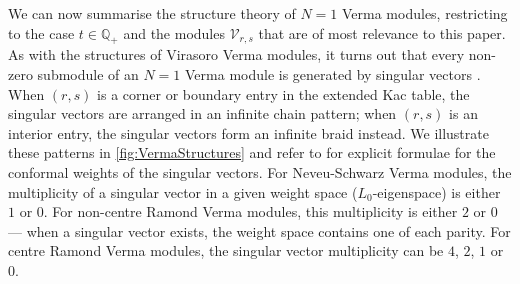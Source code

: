 \documentclass[a4paper,reqno,12pt]{report}
\theoremstyle{definition}
\numberwithin{equation}{section}
\newcommand{\QQ}{\mathbb{Q}}
\newcommand{\Ver}[1]{\mathcal{V}_{#1}}       %
\newcommand{\sv}{singular vector}
\newcommand{\svs}{singular vectors}
\newcommand{\ns}{Neveu-Schwarz}
\theoremstyle{plain}
\begin{document}
We can now summarise the structure theory \cite{AstStr97,IohRepI03} of $N=1$ Verma modules, restricting to the case $t \in \QQ_+$ and the modules $\Ver{r,s}$ that are of most relevance to this paper.  As with the structures of Virasoro Verma modules, it turns out that every non-zero submodule of an $N=1$ Verma module is generated by \svs{} \cite[Thm.~4.2]{IohRepI03}.  When $(r,s)$ is a corner or boundary entry in the extended Kac table, the \svs{} are arranged in an infinite chain pattern; when $(r,s)$ is an interior entry, the \svs{} form an infinite braid instead.  We illustrate these patterns in \cref{fig:VermaStructures} and refer to \cite{IohRepI03} for explicit formulae for the conformal weights of the \svs{}.  For \ns{} Verma modules, the multiplicity of a \sv{} in a given weight space ($L_0$-eigenspace) is either $1$ or $0$.  For non-centre Ramond Verma modules, this multiplicity is either $2$ or $0$ --- when a \sv{} exists, the weight space contains one of each parity.  For centre Ramond Verma modules, the \sv{} multiplicity can be $4$, $2$, $1$ or $0$.
\end{document}
